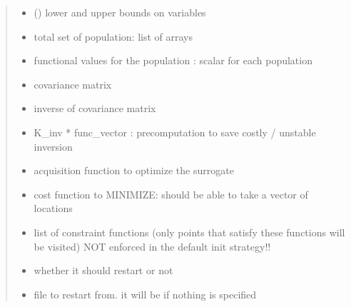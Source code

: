\documentclass[letterpaper,12pt,english]{sphinxmanual}
\begin{document}
\begin{fulllineitems}
\begin{quote}
\begin{description}
\begin{itemize}
\item {} 
\sphinxAtStartPar
{} (\sphinxstyleliteralemphasis{\sphinxupquote{,}}) \textendash{} lower and upper bounds on variables

\item {} 
\sphinxAtStartPar
{} \textendash{} total set of population: list of arrays

\item {} 
\sphinxAtStartPar
{} \textendash{} functional values for the population : scalar for each population

\item {} 
\sphinxAtStartPar
{} \textendash{} covariance matrix

\item {} 
\sphinxAtStartPar
{} \textendash{} inverse of covariance matrix

\item {} 
\sphinxAtStartPar
{} \textendash{} K\_inv * func\_vector : pre\sphinxhyphen{}computation to save costly / unstable inversion

\item {} 
\sphinxAtStartPar
{} \textendash{} acquisition function to optimize the surrogate

\item {} 
\sphinxAtStartPar
{} \textendash{} cost function to MINIMIZE: should be able to take a vector of locations

\item {} 
\sphinxAtStartPar
{} \textendash{} list of constraint functions (only points that satisfy these functions will be visited)     NOT enforced in the default init strategy!!

\item {} 
\sphinxAtStartPar
{} \textendash{} whether it should restart or not

\item {} 
\sphinxAtStartPar
{} \textendash{} file to restart from. it will be  if nothing is specified


\end{itemize}
\end{description}
\end{quote}
\end{fulllineitems}
\end{document}
